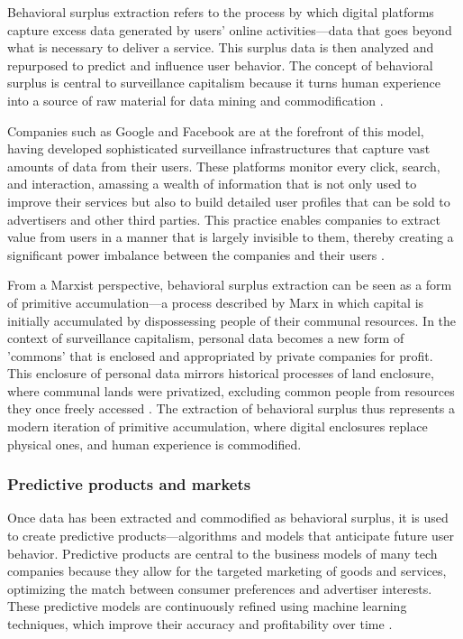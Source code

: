Behavioral surplus extraction refers to the process by which digital platforms capture excess data generated by users' online activities—data that goes beyond what is necessary to deliver a service. This surplus data is then analyzed and repurposed to predict and influence user behavior. The concept of behavioral surplus is central to surveillance capitalism because it turns human experience into a source of raw material for data mining and commodification \cite[pp.~78-80]{zuboff2020age}.

Companies such as Google and Facebook are at the forefront of this model, having developed sophisticated surveillance infrastructures that capture vast amounts of data from their users. These platforms monitor every click, search, and interaction, amassing a wealth of information that is not only used to improve their services but also to build detailed user profiles that can be sold to advertisers and other third parties. This practice enables companies to extract value from users in a manner that is largely invisible to them, thereby creating a significant power imbalance between the companies and their users \cite[pp.~125-128]{couldry2019data}.

From a Marxist perspective, behavioral surplus extraction can be seen as a form of primitive accumulation—a process described by Marx in which capital is initially accumulated by dispossessing people of their communal resources. In the context of surveillance capitalism, personal data becomes a new form of 'commons' that is enclosed and appropriated by private companies for profit. This enclosure of personal data mirrors historical processes of land enclosure, where communal lands were privatized, excluding common people from resources they once freely accessed \cite[pp.~874-876]{marx2008capital}. The extraction of behavioral surplus thus represents a modern iteration of primitive accumulation, where digital enclosures replace physical ones, and human experience is commodified.

\subsubsection{Predictive products and markets}

Once data has been extracted and commodified as behavioral surplus, it is used to create predictive products—algorithms and models that anticipate future user behavior. Predictive products are central to the business models of many tech companies because they allow for the targeted marketing of goods and services, optimizing the match between consumer preferences and advertiser interests. These predictive models are continuously refined using machine learning techniques, which improve their accuracy and profitability over time \cite[pp.~147-150]{pasquale2016black}.

